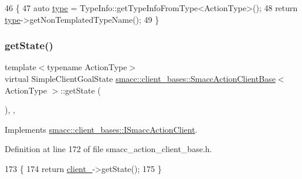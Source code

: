 \begin{DoxyCode}
46     \{
47         \textcolor{keyword}{auto} \hyperlink{namespacegenerate__debs_a50bc9a7ecac9584553e089a448bcde58}{type} = TypeInfo::getTypeInfoFromType<ActionType>();
48         \textcolor{keywordflow}{return} \hyperlink{namespacegenerate__debs_a50bc9a7ecac9584553e089a448bcde58}{type}->getNonTemplatedTypeName();
49     \}
\end{DoxyCode}
\mbox{\label{classsmacc_1_1client__bases_1_1SmaccActionClientBase_a97192acd7bb7cac5de0191e700ab72ee}} 
\subsubsection{\texorpdfstring{get\+State()}{getState()}}
{\footnotesize\ttfamily template$<$typename Action\+Type$>$ \\
virtual Simple\+Client\+Goal\+State \hyperlink{classsmacc_1_1client__bases_1_1SmaccActionClientBase}{smacc\+::client\+\_\+bases\+::\+Smacc\+Action\+Client\+Base}$<$ Action\+Type $>$\+::get\+State (\begin{DoxyParamCaption}{ }\end{DoxyParamCaption})\hspace{0.3cm}{\ttfamily [inline]}, {\ttfamily [override]}, {\ttfamily [virtual]}}



Implements \hyperlink{classsmacc_1_1client__bases_1_1ISmaccActionClient_a7380270966cec25f03ec288c747a2d7e}{smacc\+::client\+\_\+bases\+::\+I\+Smacc\+Action\+Client}.



Definition at line 172 of file smacc\+\_\+action\+\_\+client\+\_\+base.\+h.


\begin{DoxyCode}
173     \{
174         \textcolor{keywordflow}{return} \hyperlink{classsmacc_1_1client__bases_1_1SmaccActionClientBase_ac0c1dd56420ecb53cf0c90cd8bef1b4c}{client\_}->getState();
175     \}
\end{DoxyCode}
\mbox{\label{classsmacc_1_1client__bases_1_1SmaccActionClientBase_a72967f255f85e35718a1e1b0b48c38ff}} 
